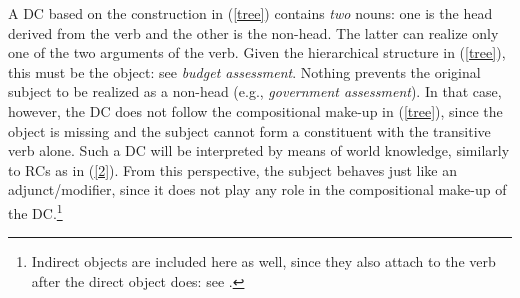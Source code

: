 \documentclass[output=paper]{langsci/langscibook}
\begin{document}
\begin{exe}
\end{exe}

 {A DC based on the construction  in (\ref{tree}) contains \textit{two} nouns: one is the head derived from the verb and the other is the non-head. The latter can realize only one of the two arguments of the verb. Given the hierarchical structure in (\ref{tree}), this must be the object: see \textit{budget assessment}. Nothing prevents the original subject to be realized as a non-head (e.g., \textit{government assessment}). In that case, however, the DC does not follow the compositional make-up in (\ref{tree}), since the object is missing and the subject cannot form a constituent with the transitive verb alone. Such a DC will be interpreted by means of world knowledge, similarly to RCs as in (\ref{2}). From this perspective, the  subject behaves just like an adjunct/modifier, since it does not play any role in the compositional make-up of the DC.}\footnote{Indirect objects are included here as well, since they also attach to the verb after the direct object does: see \cite{larson:88}.}
\end{document}
